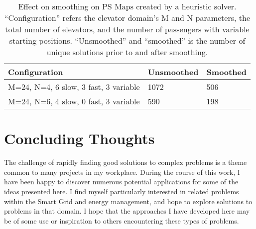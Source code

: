\begin{table}
\begin{center}
  \begin{tabular}{|p{4.5cm}|p{3cm}|p{3cm}|}
    \hline
    \textbf{Configuration} & \textbf{Unsmoothed} & \textbf{Smoothed} \\ \hline
    M=24, N=4, 6 slow, 3 fast, 3 variable & 1072 & 506 \\ \hline
    M=24, N=6, 4 slow, 0 fast, 3 variable & 590  & 198 \\ \hline
    \hline
  \end{tabular}
  \caption{Effect on smoothing on PS Maps created by a heuristic solver. ``Configuration'' refers the elevator domain's M and N parameters, the total number of elevators, and the number of passengers with variable starting positions.  ``Unsmoothed'' and ``smoothed'' is the number of unique solutions prior to and after smoothing.}
  \label{tab:smoothing}
\end{center}
\end{table}


\section{Concluding Thoughts}

The challenge of rapidly finding good solutions to complex problems is a theme common to many projects in my workplace.  During the course of this work, I have been happy to discover numerous potential applications for some of the ideas presented here.  I find myself particularly interested in related problems within the Smart Grid and energy management, and hope to explore solutions to problems in that domain.  I hope that the approaches I have developed here may be of some use or inspiration to others encountering these types of problems.
